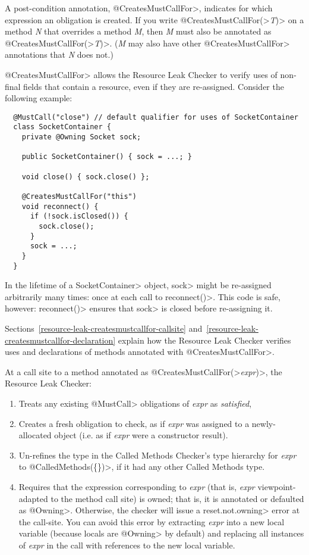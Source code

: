 A post-condition annotation,
\<@CreatesMustCallFor>,
indicates for which expression an obligation is created.
If you write \<@CreatesMustCallFor(>\emph{T}\<)> on a method \emph{N} that
overrides a method \emph{M}, then \emph{M} must also be annotated as
\<@CreatesMustCallFor(>\emph{T}\<)>.  (\emph{M} may also have other
\<@CreatesMustCallFor> annotations that \emph{N} does not.)

\<@CreatesMustCallFor> allows the Resource Leak Checker to verify uses of non-final fields
that contain a resource, even if they are re-assigned. Consider
the following example:

\begin{verbatim}
  @MustCall("close") // default qualifier for uses of SocketContainer
  class SocketContainer {
    private @Owning Socket sock;

    public SocketContainer() { sock = ...; }

    void close() { sock.close() };

    @CreatesMustCallFor("this")
    void reconnect() {
      if (!sock.isClosed()) {
        sock.close();
      }
      sock = ...;
    }
  }
\end{verbatim}

In the lifetime of a \<SocketContainer> object, \<sock>
might be re-assigned arbitrarily many times: once at each
call to \<reconnect()>. This code is safe, however: \<reconnect()>
ensures that \<sock> is closed before re-assigning it.

Sections~\ref{resource-leak-createsmustcallfor-callsite}
and~\ref{resource-leak-createsmustcallfor-declaration}
explain how the Resource Leak Checker verifies uses and declarations of
methods annotated with \<@CreatesMustCallFor>.



At a call site to a method annotated as
\<@CreatesMustCallFor(>\emph{expr}\<)>, the Resource Leak Checker:
\begin{enumerate}
\item
  Treats any existing \<@MustCall> obligations of \emph{expr} as \emph{satisfied},
\item
  Creates a fresh obligation to check, as if \emph{expr} was assigned to a newly-allocated
  object (i.e. as if \emph{expr} were a constructor result).
\item
  Un-refines the type in the Called Methods Checker's type hierarchy for \emph{expr} to
  \<@CalledMethods(\{\})>, if it had any other Called Methods type.
\item
  Requires that the expression corresponding to \emph{expr} (that is, \emph{expr}
  viewpoint-adapted to the method call site) is owned; that is, it is
  annotated or defaulted as \<@Owning>.  Otherwise, the checker
  will issue a \<reset.not.owning> error at the call-site. You can avoid this
  error by extracting \emph{expr} into a new local variable (because
  locals are \<@Owning> by default) and replacing all instances of \emph{expr}
  in the call with references to the new local variable.
\end{enumerate}

